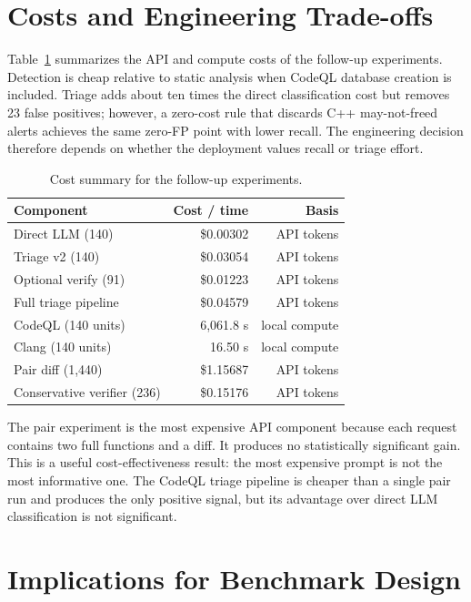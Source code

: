 \documentclass[conference]{IEEEtran}
\begin{document}
\section{Costs and Engineering Trade-offs}
\label{sec:cost}

Table~\ref{tab:cost} summarizes the API and compute costs of the follow-up experiments. Detection is cheap relative to static analysis when CodeQL database creation is included. Triage adds about ten times the direct classification cost but removes 23 false positives; however, a zero-cost rule that discards C++ may-not-freed alerts achieves the same zero-FP point with lower recall. The engineering decision therefore depends on whether the deployment values recall or triage effort.

\begin{table}[t]
\centering
\caption{Cost summary for the follow-up experiments.}
\label{tab:cost}
\footnotesize
\setlength{\tabcolsep}{3pt}
\begin{tabular}{@{}lrr@{}}
\toprule
Component & Cost / time & Basis \\
\midrule
Direct LLM (140) & \$0.00302 & API tokens \\
Triage v2 (140) & \$0.03054 & API tokens \\
Optional verify (91) & \$0.01223 & API tokens \\
Full triage pipeline & \$0.04579 & API tokens \\
CodeQL (140 units) & 6,061.8 s & local compute \\
Clang (140 units) & 16.50 s & local compute \\
Pair diff (1,440) & \$1.15687 & API tokens \\
Conservative verifier (236) & \$0.15176 & API tokens \\
\bottomrule
\end{tabular}
\end{table}

The pair experiment is the most expensive API component because each request contains two full functions and a diff. It produces no statistically significant gain. This is a useful cost-effectiveness result: the most expensive prompt is not the most informative one. The CodeQL triage pipeline is cheaper than a single pair run and produces the only positive signal, but its advantage over direct LLM classification is not significant.

\section{Implications for Benchmark Design}
\label{sec:benchmark}
\end{document}
